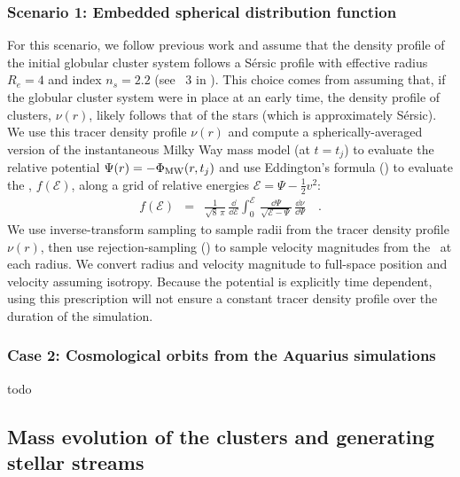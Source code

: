 \documentclass[manuscript, letterpaper]{aastex6}
\begin{document}
\subsubsection{Scenario 1: Embedded spherical distribution function} \label{sec:sphdf}

For this scenario, we follow previous work and assume that the density profile
of the initial globular cluster system follows a S\'ersic profile with effective
radius $R_e=4$ and index $n_s = 2.2$ (see \sectionname~3 in
\citealt{Gnedin:2014}).
This choice comes from assuming that, if the globular cluster system were in
place at an early time, the density profile of clusters, $\nu(r)$, likely
follows that of the stars (which is approximately S\'ersic).
We use this tracer density profile $\nu(r)$ and compute a spherically-averaged
version of the instantaneous Milky Way mass model (at $t=t_j$) to evaluate the
relative potential $\Psi(r) = -\Phi_{\rm MW}(r,t_j)$ and use Eddington's formula
(\citealt{Eddington:1916,Binney:2008}) to evaluate the \df, $f(\mathcal{E})$,
along a grid of relative energies $\mathcal{E} = \Psi - \frac{1}{2}v^2$:
\begin{eqnarray}
  f(\mathcal{E}) &=& \frac{1}{\sqrt{8}\,\pi} \, \frac{\dd}{\dd \mathcal{E}}
    \int_0^\mathcal{E} \, \frac{\dd \Psi}{\sqrt{\mathcal{E} - \Psi}} \,
    \frac{\dd \nu}{\dd \Psi} \quad .
\end{eqnarray}
We use inverse-transform sampling to sample radii from the tracer density
profile $\nu(r)$, then use rejection-sampling (\citealt{vonneumann}) to sample
velocity magnitudes from the \df\ at each radius.
We convert radius and velocity magnitude to full-space position and velocity
assuming isotropy.
Because the potential is explicitly time dependent, using this prescription will
not ensure a constant tracer density profile over the duration of the
simulation.

\subsubsection{Case 2: Cosmological orbits from the Aquarius simulations} \label{sec:cosmoorbits}

todo

\subsection{Mass evolution of the clusters and generating stellar streams} \label{sec:mockstreams}
\end{document}
